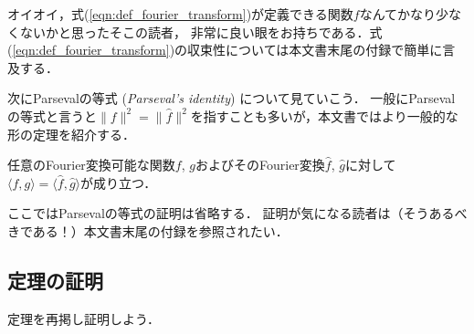 オイオイ，式(\ref{eqn:def_fourier_transform})が定義できる関数$f$なんてかなり少なくないかと思ったそこの読者，
非常に良い眼をお持ちである．式(\ref{eqn:def_fourier_transform})の収束性については本文書末尾の付録で簡単に言及する．

次にParsevalの等式 (\textit{Parseval's identity}) について見ていこう．
一般にParsevalの等式と言うと$\|f\|^2 = \|\widehat{f}\|^2$を指すことも多いが，本文書ではより一般的な形の定理を紹介する．

\begin{theorem}[Parsevalの等式]
    任意のFourier変換可能な関数$f$, $g$およびそのFourier変換$\widehat{f}$, $\widehat{g}$に対して
    $\langle f, g \rangle = \langle \widehat{f}, \widehat{g} \rangle$が成り立つ．
\end{theorem}

ここではParsevalの等式の証明は省略する．
証明が気になる読者は（そうあるべきである！）本文書末尾の付録を参照されたい．

\subsection*{定理の証明}

定理を再掲し証明しよう．

